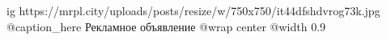  
 
 
 
 

\ifcmt
  ig https://mrpl.city/uploads/posts/resize/w/750x750/it44dfshdvrog73k.jpg
	@caption_here Рекламное объявление
  @wrap center
  @width 0.9
\fi
